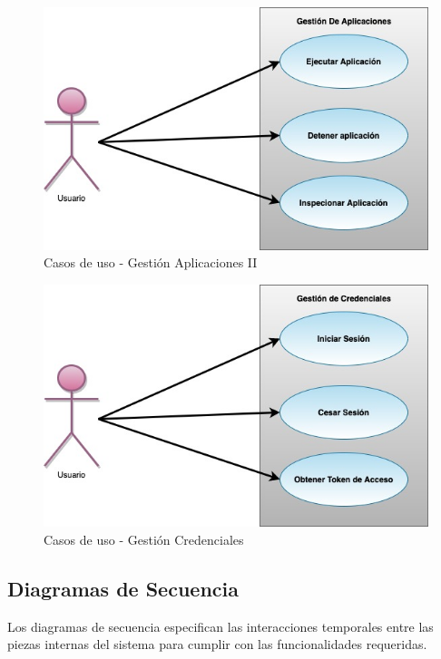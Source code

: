 \documentclass[a4paper,11pt]{book}
\begin{document}
\begin{figure}[H]
\centering
\includegraphics[scale=0.50]{imagenes/casosUso2.jpg}
\caption{ Casos de uso - Gestión Aplicaciones II\cite{diagrama}  }
\end{figure}

\begin{figure}[H]
\centering
\includegraphics[scale=0.50]{imagenes/casosUso3.jpg}
\caption{ Casos de uso - Gestión Credenciales\cite{diagrama}  }
\end{figure}

\subsection{Diagramas de Secuencia}
Los diagramas de secuencia especifican las interacciones temporales entre las piezas internas del sistema para cumplir con las funcionalidades requeridas.
\end{document}
